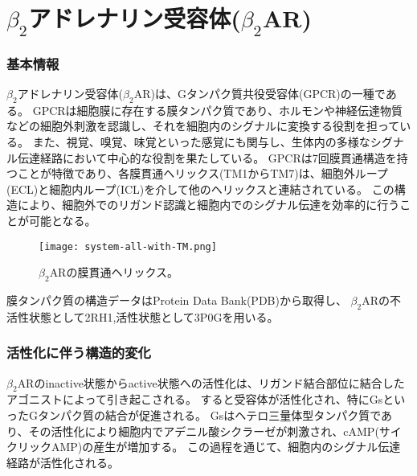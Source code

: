 \section{$\beta_2$アドレナリン受容体($\beta_2$AR)}
\label{sec:b2ar}

\subsubsection{基本情報}
$\beta_2$アドレナリン受容体($\beta_2$AR)は、Gタンパク質共役受容体(GPCR)の一種である。
GPCRは細胞膜に存在する膜タンパク質であり、ホルモンや神経伝達物質などの細胞外刺激を認識し、それを細胞内のシグナルに変換する役割を担っている。
また、視覚、嗅覚、味覚といった感覚にも関与し、生体内の多様なシグナル伝達経路において中心的な役割を果たしている。
GPCRは7回膜貫通構造を持つことが特徴であり、各膜貫通ヘリックス(TM1からTM7)は、細胞外ループ(ECL)と細胞内ループ(ICL)を介して他のヘリックスと連結されている。
この構造により、細胞外でのリガンド認識と細胞内でのシグナル伝達を効率的に行うことが可能となる。

\begin{figure}[htbp]
  \centering
  \texttt{[image: system-all-with-TM.png]}
  \caption{$\beta_2$ARの膜貫通ヘリックス。}
  \label{fig:all}
\end{figure}

\newpage

膜タンパク質の構造データはProtein Data Bank(PDB)から取得し、
$\beta_2$ARの不活性状態として2RH1\cite{cherezov2007},活性状態として3P0G\cite{rasmussen2011}を用いる。

\subsubsection{活性化に伴う構造的変化}
$\beta_2$ARのinactive状態からactive状態への活性化は、リガンド結合部位に結合したアゴニストによって引き起こされる。
すると受容体が活性化され、特にGsといったGタンパク質の結合が促進される。
Gsはヘテロ三量体型タンパク質であり、その活性化により細胞内でアデニル酸シクラーゼが刺激され、cAMP(サイクリックAMP)の産生が増加する。
この過程\cite{philip2007}を通じて、細胞内のシグナル伝達経路が活性化される。

